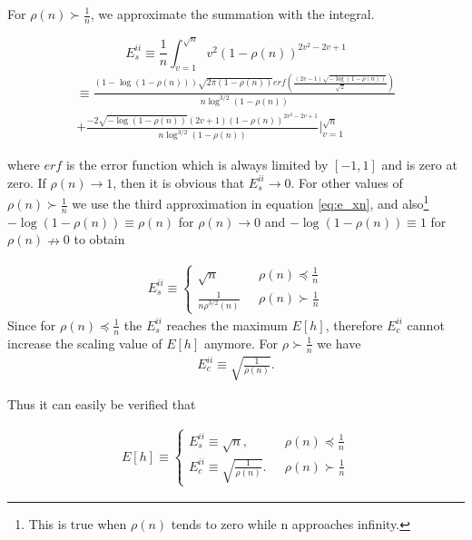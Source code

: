 \documentclass[journal]{IEEEtran}
\theoremstyle{plain}
\theoremstyle{remark}
\begin{document}
\begin{IEEEproof}
For $\rho(n) \succ \frac{1}{n}$, we approximate the summation with the integral.

\begin{equation}
E_s^{ii}\equiv \frac{1}{n}\int_{v=1}^{\sqrt{n}} v^2(1-\rho(n))^{2v^2-2v+1} \nonumber 
\end{equation}
\begin{eqnarray}
&\equiv \frac{(1-\log(1-\rho(n)))\sqrt{2\pi(1-\rho(n))} erf(\frac{(2v-1)\sqrt{-\log(1-\rho(n))}}{\sqrt{2}})}{n\log^{3/2}(1-\rho(n))}&
 \nonumber \\
&+  \frac{-2\sqrt{-\log(1-\rho(n))}(2v+1)(1-\rho(n))^{2v^2-2v+1}}{n\log^{3/2}(1-\rho(n))}|_{v=1}^{\sqrt{n}}&
\end{eqnarray}

where $erf$ is the error function which is always limited by $[-1,1]$ and is zero at zero.
If $\rho(n) \rightarrow 1$, then it is obvious that $E_s^{ii}\rightarrow 0$. For other values of $\rho(n) \succ \frac{1}{n}$ we use the third approximation in equation \eqref{eq:e_xn}, and also\footnote{This is true when $\rho(n)$ tends to zero while n approaches infinity.} $-\log(1-\rho(n))\equiv \rho(n)$ for $\rho(n)\rightarrow 0$ and $-\log(1-\rho(n))\equiv 1$ for $\rho(n)\nrightarrow 0$ to obtain

\begin{eqnarray}
E_s^{ii} \equiv \left\{\begin{array}{ll}
					\sqrt{n}& \ \ \  \rho(n)\preceq \frac{1}{n} \\
					\frac{1}{n\rho^{3/2}(n)}& \ \ \  \rho(n)\succ \frac{1}{n}
			\end{array}\right . \label{eq:Esii}
\end{eqnarray}
Since for $\rho(n)\preceq \frac{1}{n}$ the $E_s^{ii}$ reaches the maximum $E[h]$, therefore $E_c^{ii}$ cannot increase the scaling value of $E[h]$ anymore.
For $\rho \succ \frac{1}{n}$  we have
\begin{eqnarray}
E_c^{ii} \equiv \sqrt{\frac{1}{ \rho(n)}}. \label{eq:Ecii}
\end{eqnarray}

Thus it can easily be verified that

\begin{eqnarray}
E[h]\equiv \left\{\begin{array}{ll}
					E_s^{ii} \equiv \sqrt{n},& \ \ \  \rho(n)\preceq \frac{1}{n} \\
					E_c^{ii}\equiv \sqrt{\frac{1}{ \rho(n)}}.& \ \ \  \rho(n)\succ \frac{1}{n}
			\end{array}\right . 
\end{eqnarray}



\end{IEEEproof}
\end{document}
